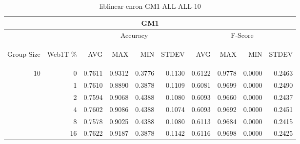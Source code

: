 \begin{center}
\begin{table}[htbp] 
 \begin{center}
\begin{tabular}{ | r | r | r | r | r | r | r | r | r | r |}
\hline
\multicolumn{10}{|c|}{GM1}\\
\hline
 & & \multicolumn{4}{|c|}{Accuracy} & \multicolumn{4}{|c|}{F-Score}\\ \cline{3-10}
\begin{sideways}Group Size\end{sideways} & \begin{sideways}Web1T \%\end{sideways} & \begin{sideways}AVG\end{sideways} & \begin{sideways}MAX\end{sideways} & \begin{sideways}MIN\end{sideways} & \begin{sideways}STDEV\end{sideways} & \begin{sideways}AVG\end{sideways} & \begin{sideways}MAX\end{sideways} & \begin{sideways}MIN\end{sideways} & \begin{sideways}STDEV\end{sideways}\\
\hline
\multirow{5}{*}{10}
 & 0 & 0.7611 & 0.9312 & 0.3776 & 0.1130 & 0.6122 & 0.9778 & 0.0000 & 0.2463\\ \cline{2-10}
 & 1 & 0.7610 & 0.8890 & 0.3878 & 0.1109 & 0.6081 & 0.9699 & 0.0000 & 0.2490\\ \cline{2-10}
 & 2 & 0.7594 & 0.9068 & 0.4388 & 0.1080 & 0.6093 & 0.9660 & 0.0000 & 0.2437\\ \cline{2-10}
 & 4 & 0.7602 & 0.9086 & 0.4388 & 0.1074 & 0.6093 & 0.9692 & 0.0000 & 0.2451\\ \cline{2-10}
 & 8 & 0.7578 & 0.9025 & 0.4388 & 0.1080 & 0.6113 & 0.9684 & 0.0000 & 0.2415\\ \cline{2-10}
 & 16 & 0.7622 & 0.9187 & 0.3878 & 0.1142 & 0.6116 & 0.9698 & 0.0000 & 0.2425\\ \cline{2-10}
\hline
\end{tabular}
\caption{liblinear-enron-GM1-ALL-ALL-10}
\label{table:liblinear-enron-GM1-ALL-ALL-10}
\end{center}
 \end{table}
\end{center}

